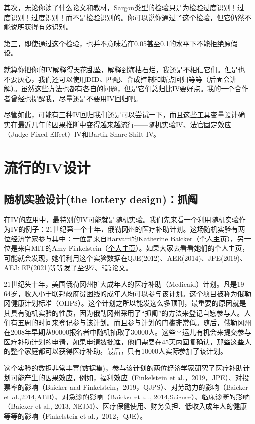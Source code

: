 \documentclass[cn,12pt,math=newtx,citestyle=gb7714-2015,bibstyle=gb7714-2015]{elegantbook}
\begin{document}
	其次，无论你读了什么论文和教材，Sargon类型的检验只是为检验过度识别！过度识别！过度识别！而不是检验识别的。你可以说你通过了这个检验，但它仍然不能说明获得有效识别。
	
	第三，即使通过这个检验，也并不意味着在0.05甚至0.1的水平下不能拒绝原假设。
	
	就算你把你的IV解释得天花乱坠，解释到海枯石烂，我还是不相信它们。但是也不要灰心，我们还可以使用DID、匹配、合成控制和断点回归等等（后面会讲解）。虽然这些方法也都有各自的问题，但是它们总归比IV要好点。我的一个合作者曾经也提醒我，尽量还是不要用IV回归吧。
	
	尽管如此，可能有三种IV回归我们还是可以尝试一下，而且这些工具变量设计确实在最近几年的因果推断中变得越来越流行——随机实验IV、法官固定效应（Judge Fixed Effect）IV和Bartik Share-Shift IV。
	
	
	\section{流行的IV设计}
	\subsection{随机实验设计(the lottery design)：抓阄}
	
	在IV的应用中，最特别的IV可能就是随机实验。我们先来看一个利用随机实验作为IV的例子：21世纪第一个十年，俄勒冈州的医疗补助计划。这场随机实验有两位经济学家参与其中：一位是来自Harvard的Katherine Baicker（\href{https://connects.catalyst.harvard.edu/Profiles/display/Person/40507}{个人主页}），另一位是来自MIT的Amy Finkelstein（\href{http://economics.mit.edu/faculty/afink}{个人主页}）。如果大家去看看她们的个人主页，可能就会发现，她们利用这个实验数据在QJE(2012)、AER(2014)、JPE(2019)、AEJ: EP(2021)等等发了至少7、8篇论文。
	
	21世纪头十年，美国俄勒冈州扩大成年人的医疗补助（Medicaid）计划。凡是19-64岁，收入小于联邦政府贫困线的成年人均可以参与该计划。这个项目被称为俄勒冈健康计划标准（OHPS）。这个计划之所以能发这么多顶刊，最重要的原因就是其具有随机实验的性质，因为俄勒冈州采用了“抓阄”的方法来登记自愿参与人。人们有五周的时间来登记参与该计划。而且参与计划的门槛非常低。随后，俄勒冈州在2008年早期从90000报名者中随机抽取了30000人。这些幸运儿有机会来提交参与医疗补助计划的申请，如果申请被批准，他们需要在45天内回复确认，那些这些人的整个家庭都可以获得医疗补助。最后，只有10000人实际参加了该计划。
	
	这个实验的数据非常丰富(\href{https://www.nber.org/research/data/oregon-health-insurance-experiment-data}{数据集})，参与该计划的两位经济学家研究了医疗补助计划可能产生的因果效应，例如，福利效应（Finkelstein et al.，2019，JPE）、对投票率的影响（Baicker and Finkelstein，2019，QJPS）、对劳动力的影响（Baicker et al.,2014,AER）、对急诊的影响（Baicker et al., 2014,Science）、临床诊断的影响（Baicker et al., 2013, NEJM）、医疗保健使用、财务负担、低收入成年人的健康等等的影响（Finkelstein et al.，2012，QJE）。
	
\end{document}
